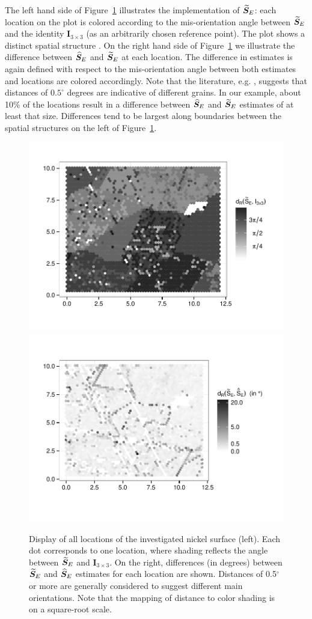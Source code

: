 The left hand side of Figure~\ref{fig:grain-map} illustrates the implementation of ${\widetilde{\bm S}_E}$: each location on the plot is colored according to the mis-orientation angle between ${\widetilde{\bm S}_E}$  and the identity $\bm I_{3\times 3}$ (as an arbitrarily chosen reference point).  The plot shows a distinct spatial structure . On the right hand side of Figure~\ref{fig:grain-map} we illustrate the difference between ${\widehat{\bm S}_E}$ and ${\widetilde{\bm S}_E}$ at each location. The difference in estimates is again defined with respect to the mis-orientation angle between both estimates and locations are colored accordingly. Note that the literature, e.g. \cite{bingham10b}, suggests that distances of $0.5^\circ$ degrees are indicative of different grains. In our example, about 10\% of the locations result in a difference between ${\widehat{\bm S}_E}$ and ${\widetilde{\bm S}_E}$ estimates of at least that size. Differences tend to be largest along boundaries between the spatial structures on the left of Figure~\ref{fig:grain-map}.  
\begin{figure}[htbp] %
   \centering
   \vspace{-.15in}
   \includegraphics[width=.49\textwidth]{images/grain-map.pdf} 
   \includegraphics[width=.49\textwidth]{images/grain-diff.pdf} 
    \vspace{-.175in} 
   \caption{ \label{fig:grain-map}  Display of all locations of the investigated nickel surface (left). Each dot corresponds to one location, where shading reflects the angle between ${\widetilde{\bm S}_E}$ and $\bm I_{3\times 3}$. On the right, differences (in degrees) between ${\widetilde{\bm S}_E}$ and ${\widehat{\bm S}_E}$ estimates for each location are shown. Distances of 0.5$^\circ$ or more are generally considered to suggest different main orientations. Note that the mapping of distance to color shading is on a square-root scale.}
\end{figure}
